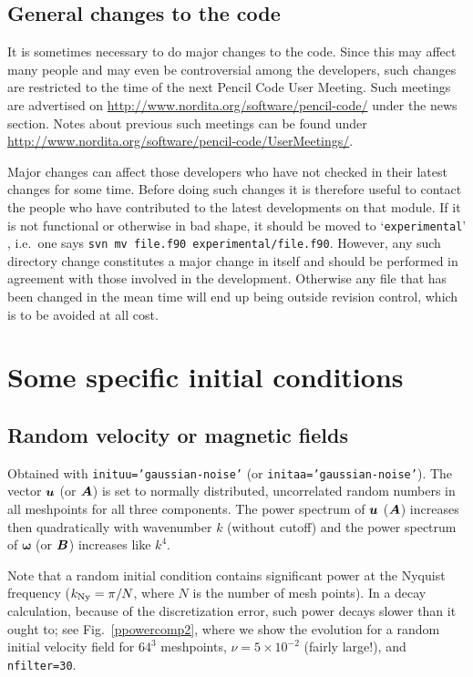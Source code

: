 \documentclass[\mydriver,12pt,twoside,notitlepage,a4paper]{article}
\makeatletter
\newcommand{\code}[1]{\texttt{#1}}
\newcommand{\file}[2][]{%
  \def\index@{#1}%
  `\texttt{#2}'%
  \ifx\index@\@empty\index[file]{#2@\texttt{#2}}%
  \else\index[file]{#1@\texttt{#1}}%
  \fi%
}
\renewcommand{\vec}[1]{\mbox{\boldmath{$#1$}}}
\newcommand{\Av}            {\vec{A}}
\newcommand{\Bv}            {\vec{B}}
\newcommand{\uv}            {\vec{u}}
\newcommand{\omv}           {\boldsymbol{\omega}}
\makeatother
\begin{document}
\subsection{General changes to the code}

It is sometimes necessary to do major changes to the code.
Since this may affect many people and may even be controversial
among the developers, such changes are restricted to the time
of the next Pencil Code User Meeting.
Such meetings are advertised on \url{http://www.nordita.org/software/pencil-code/}
under the news section.
Notes about previous such meetings can be found under
\url{http://www.nordita.org/software/pencil-code/UserMeetings/}.

Major changes can affect those developers who have not checked in
their latest changes for some time.
Before doing such changes it is therefore useful to contact the people
who have contributed to the latest developments on that module.
If it is not functional or otherwise in bad shape, it should be
moved to \file{experimental}, i.e.\ one says
\code{svn mv file.f90 experimental/file.f90}.
However, any such directory change constitutes a major change in
itself and should be performed in agreement with those involved in
the development.
Otherwise any file that has been changed in the mean time will end up
being outside revision control, which is to be avoided at all cost.


\section{Some specific initial conditions}

\subsection{Random velocity or magnetic fields}

Obtained with \code{inituu='gaussian-noise'}
(or \code{initaa='gaussian-noise'}).
The vector $\uv$ (or $\Av$) is set to normally distributed, uncorrelated random
numbers in all meshpoints for all three components.
The power spectrum of
$\uv$ ($\Av$) increases then quadratically with wavenumber $k$ (without cutoff)
and the power spectrum of $\omv$ (or $\Bv$) increases like $k^4$.

Note that a random initial condition contains significant power at the
Nyquist frequency ($k_{\rm Ny}=\pi/N$, where $N$ is the number of mesh
points). In a decay calculation, because of the discretization error,
such power decays slower than it ought to; see Fig.~\ref{ppowercomp2},
where we show the evolution for a random initial velocity field for $64^3$
meshpoints, $\nu=5\times10^{-2}$ (fairly large!), and \code{nfilter=30}.
\end{document}
